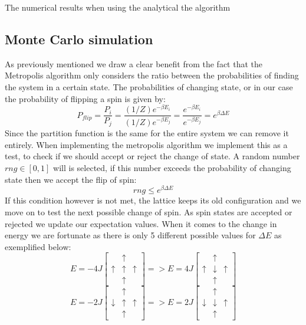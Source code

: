 \documentclass{emulateapj}
\begin{document}
%
The numerical results when using the analytical the algorithm
%
%
\subsection{Monte Carlo simulation}
As previously mentioned we draw a clear benefit from the fact that the Metropolis algorithm only considers the ratio between the probabilities of finding the system in a certain state. The probabilities of changing state, or in our case the probability of flipping a spin is given by:
%
\begin{equation*}
    P_{flip} = \frac{P_{i}}{P_{j}} = \frac{(1/Z)e^{-\beta E_i}}{(1/Z)e^{-\beta E_j}} = \frac{e^{-\beta E_i}}{e^{-\beta E_j}} = e^{\beta \Delta E}
\end{equation*}
%
Since the partition function is the same for the entire system we can remove it entirely. When implementing the metropolis algorithm we implement this as a test, to check if we should accept or reject the change of state. A random number $rng \in [0,1]$ will is selected, if this number exceeds the probability of changing state then we accept the flip of spin:
%
\begin{equation*}
    rng \leq e^{\beta \Delta E}
\end{equation*}
%
If this condition however is not met, the lattice keeps its old configuration and we move on to test the next possible change of spin. As spin states are accepted or rejected we update our expectation values. When it comes to the change in energy we are fortunate as there is only 5 different possible values for $\Delta E$ as exemplified below:
%
\begin{equation*}
    E = -4J
    \begin{bmatrix}
        & \uparrow &  \\
        \uparrow & \uparrow & \uparrow \\
         & \uparrow &
    \end{bmatrix}
    =>
    E = 4J
    \begin{bmatrix}
        & \uparrow &  \\
        \uparrow & \downarrow & \uparrow \\
         & \uparrow &
    \end{bmatrix}
\end{equation*}
%
%
\begin{equation*}
    E = -2J
    \begin{bmatrix}
        & \uparrow &  \\
        \downarrow & \uparrow & \uparrow \\
         & \uparrow &
    \end{bmatrix}
    =>
    E = 2J
    \begin{bmatrix}
        & \uparrow &  \\
        \downarrow & \downarrow & \uparrow \\
         & \uparrow &
    \end{bmatrix}
\end{equation*}
\end{document}
